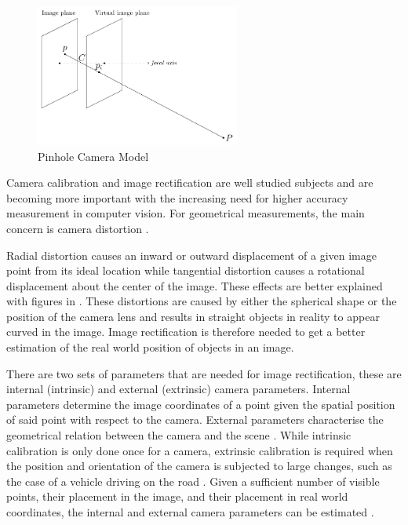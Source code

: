 \begin{figure}[H]
    \centering
    \includegraphics[width = 0.6\textwidth]{Figures/camera_model_1.pdf}
    \caption{Pinhole Camera Model}
    \label{fig:pinhole_model}
\end{figure}

Camera calibration and image rectification are well studied subjects and are becoming  more important with the increasing need for higher accuracy measurement in computer vision. For geometrical measurements, the main concern is camera distortion \cite{wang2008new}.

Radial distortion causes an inward or outward displacement of a given image point from its ideal location while tangential distortion causes a rotational displacement about the center of the image. These effects are better explained with figures in \cite{wang2008new}. These distortions are caused by either the spherical shape or the position of the camera lens and results in straight objects in reality to appear curved in the image. Image rectification is therefore needed to get a better estimation of the real world position of objects in an image.

There are two sets of parameters that are needed for image rectification, these are internal (intrinsic) and external (extrinsic)  camera parameters. Internal parameters determine the image coordinates of a point given the spatial position of said point with respect to the camera. External parameters characterise the geometrical relation between the camera and the scene \cite{wang2008new}. While intrinsic calibration is only done once for a camera, extrinsic calibration is required when the position and orientation of the camera is subjected to large changes, such as the case of a vehicle driving on the road \cite{wang2004simple}. Given a sufficient number of visible points, their placement in the image, and their placement in real world coordinates, the internal and external camera parameters can be estimated \cite{wang2008new}.




